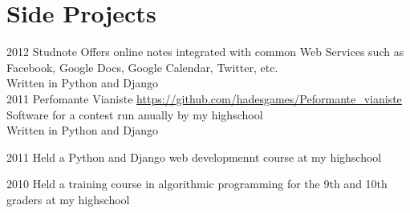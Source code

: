 \documentclass[]{friggeri-cv}
\begin{document}


% 

\pagebreak

\section{Side Projects}

\begin{entrylist}
  \entry
  {2012} 
  {}
  {Studnote}
  {}%
  {
    Offers online notes integrated with common Web Services such as Facebook, Google Docs, Google Calendar, Twitter, etc. \\
    Written in Python and Django \\ 
  }
  \entry
  {2011}
  {}
  {Perfomante Vianiste}
  {
    \href{https://github.com/hadesgames/Performante\_vianiste}{https://github.com/hadesgames/Peformante\_vianiste}
  }
  {
    Software for a contest run anually by my highschool \\
    Written in Python and Django \\
  }

  \entry
  {2011}
  {}
  {Held a Python and Django web developmennt course at my highschool}
  {}
  {}

  \entry
  {2010}
  {}
  {Held a training course in algorithmic programming for the 9th and 10th graders at my highschool}
  {}
  {}
\end{entrylist}
\end{document}
